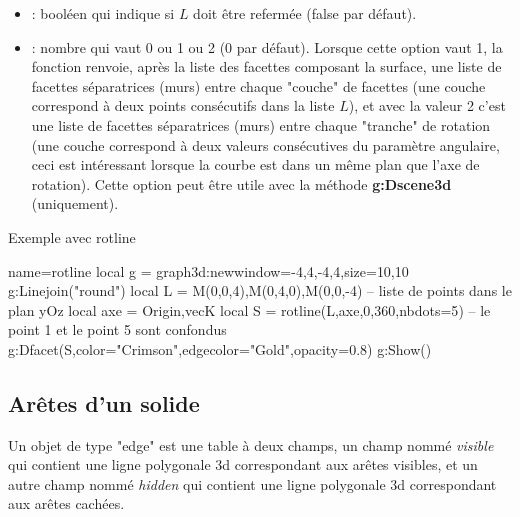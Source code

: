 \begin{itemize}
\begin{itemize}
        \item {} : booléen qui indique si $L$ doit être refermée (false par défaut).

        \item {} : nombre qui vaut 0 ou 1 ou 2 (0 par défaut). Lorsque cette option vaut 1, la fonction renvoie, après la liste des facettes composant la surface, une liste de facettes séparatrices (murs) entre chaque "couche" de facettes (une couche correspond à deux points consécutifs dans la liste $L$), et avec la valeur 2 c'est une liste de facettes séparatrices (murs) entre chaque "tranche" de rotation (une couche correspond à deux valeurs consécutives du paramètre angulaire, ceci est intéressant lorsque la courbe est dans un même plan que l'axe de rotation). Cette option peut être utile avec la méthode \textbf{g:Dscene3d} (uniquement).
        \end{itemize} 
\begin{demo}{Exemple avec rotline}
\begin{luadraw}{name=rotline}
local g = graph3d:new{window={-4,4,-4,4},size={10,10}}
g:Linejoin("round")
local L = {M(0,0,4),M(0,4,0),M(0,0,-4)} -- liste de points dans le plan yOz
local axe = {Origin,vecK}
local S = rotline(L,axe,0,360,{nbdots=5}) -- le point 1 et le point 5 sont confondus
g:Dfacet(S,{color="Crimson",edgecolor="Gold",opacity=0.8})
g:Show()
\end{luadraw}
\end{demo}      
\end{itemize}   

\subsection{Arêtes d'un solide}

Un objet de type "edge" est une table à deux champs, un champ nommé \emph{visible} qui contient une ligne polygonale 3d correspondant aux arêtes visibles, et un autre champ nommé \emph{hidden} qui contient une ligne polygonale 3d correspondant aux arêtes cachées.

